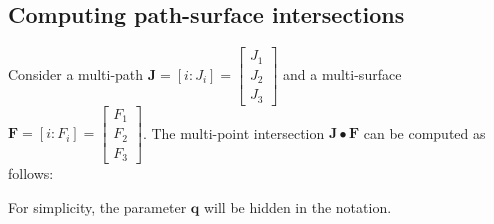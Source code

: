 \subsection{Computing path-surface intersections}

Consider a multi-path \(\mathbf{J} = [i : J_i] = \begin{bmatrix} J_1 \\ J_2 \\ J_3 \end{bmatrix}\) and a multi-surface \(\mathbf{F} = [i : F_i] = \begin{bmatrix} F_1 \\ F_2 \\ F_3 \end{bmatrix}\). The multi-point intersection \(\mathbf{J} \bullet \mathbf{F}\) can be computed as follows:

For simplicity, the parameter \(\mathbf{q}\) will be hidden in the notation.

\vspace{1mm}

